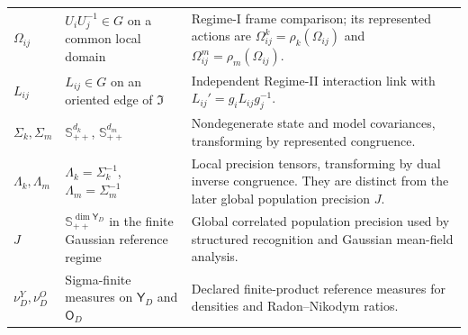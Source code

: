\begin{longtable}{>{\raggedright\arraybackslash}p{}>{\raggedright\arraybackslash}p{}>{\raggedright\arraybackslash}p{}}
\(\Omega_{ij}\) &
\(U_iU_j^{-1}\in G\) on a common local domain &
Regime-I frame comparison; its represented actions are \(\Omega_{ij}^{k}=\rho_k(\Omega_{ij})\) and \(\Omega_{ij}^{m}=\rho_m(\Omega_{ij})\).\\
\(L_{ij}\) &
\(L_{ij}\in G\) on an oriented edge of \(\mathfrak I\) &
Independent Regime-II interaction link with \(L_{ij}'=g_iL_{ij}g_j^{-1}\).\\
\(\Sigma_k,\Sigma_m\) &
\(\mathbb S_{++}^{d_k}\), \(\mathbb S_{++}^{d_m}\) &
Nondegenerate state and model covariances, transforming by represented congruence.\\
\(\Lambda_k,\Lambda_m\) &
\(\Lambda_k=\Sigma_k^{-1}\), \(\Lambda_m=\Sigma_m^{-1}\) &
Local precision tensors, transforming by dual inverse congruence. They are distinct from the later global population precision \(J\).\\
\(J\) &
\(\mathbb S_{++}^{\dim\mathsf Y_D}\) in the finite Gaussian reference regime &
Global correlated population precision used by structured recognition and Gaussian mean-field analysis.\\
\(\nu_D^Y,\nu_D^O\) &
Sigma-finite measures on \(\mathsf Y_D\) and \(\mathsf O_D\) &
Declared finite-product reference measures for densities and Radon--Nikodym ratios.\\
\end{longtable}
\normalsize
